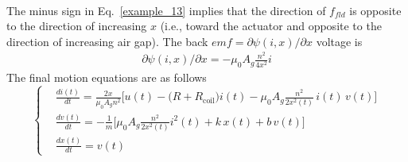 \documentclass[12pt,a4paper,oneside]{book}
\begin{document}
\begin{onehalfspace}
\begin{example}
\begin{equation}
\begin{aligned}
	\end{aligned}
\end{equation}
The minus sign in Eq.~\eqref{example_13} implies that the direction of $f_{fld}$ is opposite to the direction of increasing $x$ (i.e., toward the actuator and opposite to the direction of increasing air gap). 
The back $emf = \partial \psi(i,x)/\partial x$ voltage is 
  \begin{equation}\label{example_14}	
  	\begin{aligned}
  		\partial \psi(i,x)/\partial x= -\mu_0A_g\frac{n^2}{4x^2} i
  	\end{aligned}
  \end{equation}
The final motion equations are as follows
\begin{equation}\label{example_15}	
	\left\lbrace 
	\begin{aligned}
		&\frac{di(t)}{dt} = \frac{2x}{\mu_0A_gn^2} \Big[u(t) -\big(R+R_{\text{coil}}\big)i(t) -\mu_0A_g\frac{n^2}{2x^2(t)}\, i(t)\,v(t)\Big] \\[8pt]
		&\frac{dv(t)}{dt} =  -\frac{1}{m}\Bigg[\mu_0A_g\frac{n^2}{2x^2(t)} i^2(t) + k\,x(t)+b\,v(t)\Bigg] \\[8pt]
		&\frac{dx(t)}{dt} = v(t)
	\end{aligned}
	\right. 
\end{equation}
\end{example}


\end{onehalfspace}
\end{document}
